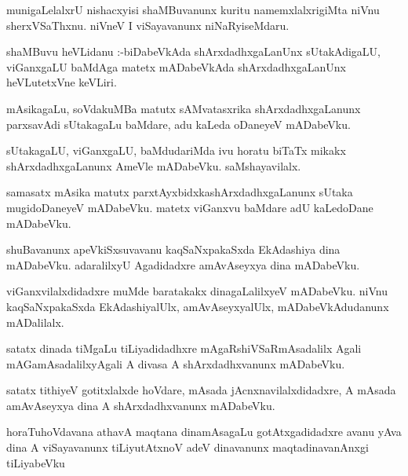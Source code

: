 \documentclass{article}
\begin{document}
\begin{mn}
munigaLelalxrU  nishacxyisi  shaMBuvanunx  kuritu  namemxlalxrigiMta  niVnu  sherxVSaThxnu.  niVneV  I  viSayavanunx  niNaRyiseMdaru.
\end{mn}

\begin{mn}
shaMBuvu  heVLidanu :-biDabeVkAda  shArxdadhxgaLanUnx  sUtakAdigaLU,  viGanxgaLU  baMdAga  matetx  mADabeVkAda  shArxdadhxgaLanUnx 
heVLutetxVne  keVLiri.
\end{mn}

\begin{mn}
mAsikagaLu,  soVdakuMBa  matutx  sAMvatasxrika  shArxdadhxgaLanunx  parxsavAdi  sUtakagaLu  baMdare,  adu  kaLeda  oDaneyeV  mADabeVku.
\end{mn}

\begin{mn}
sUtakagaLU,  viGanxgaLU,  baMdudariMda  ivu  horatu  biTaTx  mikakx  shArxdadhxgaLanunx  AmeVle  mADabeVku.  saMshayavilalx.
\end{mn}

\begin{mn}
samasatx  mAsika matutx  parxtAyxbidxkashArxdadhxgaLanunx  sUtaka mugidoDaneyeV  mADabeVku.  matetx  viGanxvu  baMdare  
adU  kaLedoDane  mADabeVku.
\end{mn}

\begin{mn}
shuBavanunx  apeVkiSxsuvavanu  kaqSaNxpakaSxda  EkAdashiya  dina  mADabeVku.  adaralilxyU  Agadidadxre  amAvAseyxya  dina  mADabeVku.
\end{mn}

\begin{mn}
viGanxvilalxdidadxre  muMde  baratakakx dinagaLalilxyeV  mADabeVku.  niVnu  kaqSaNxpakaSxda  EkAdashiyalUlx,  amAvAseyxyalUlx,  
mADabeVkAdudanunx  mADalilalx.
\end{mn}

\begin{mn}
satatx  dinada  tiMgaLu  tiLiyadidadhxre  mAgaRshiVSaRmAsadalilx  Agali  mAGamAsadalilxyAgali  A  divasa  A  shArxdadhxvanunx  mADabeVku.  
\end{mn}

\begin{mn}
satatx  tithiyeV  gotitxlalxde  hoVdare,  mAsada  jAcnxnavilalxdidadxre,  A  mAsada  amAvAseyxya  dina  A  shArxdadhxvanunx  mADabeVku.
\end{mn}

\begin{mn}
horaTuhoVdavana  athavA  maqtana  dinamAsagaLu  gotAtxgadidadxre  avanu  yAva  dina  A  viSayavanunx  tiLiyutAtxnoV  adeV  dinavanunx  
maqtadinavanAnxgi  tiLiyabeVku
\end{mn}
\end{document}
